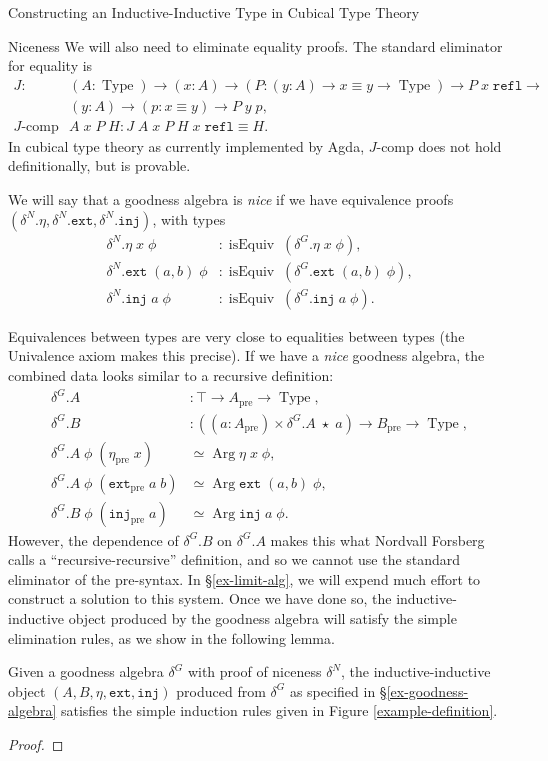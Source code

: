 \documentclass[runningheads]{llncs}
\DeclareMathOperator{\USet}{Type}
\DeclareMathOperator{\isEquiv}{isEquiv}
\DeclareMathOperator{\Arg}{Arg}
\newcommand{\pre}[1]{{#1}_\text{pre}}
\newcommand{\Id}[2]{{#1}\equiv{#2}}
\newcommand{\join}{\texttt{ext}}
\newcommand{\inj}{\texttt{inj}}
\newcommand{\refl}{\texttt{refl}}
\def\Forsberg/{Nordvall Forsberg}
\begin{document}
\begin{section}{Constructing an Inductive-Inductive Type in Cubical Type Theory}
\begin{subsection}{Niceness}
{We will also need to eliminate equality proofs. The standard eliminator for equality is \begin{align*}J :&\; (A : \USet) \to (x : A) \to (P : (y : A) \to \Id{x}{y} \to \USet) \to P\;x\;\refl \to\\&\; (y : A) \to (p : \Id{x}{y}) \to P\;y\;p,\\J\text{-comp}&\;A\;x\;P\;H : \Id{J\;A\;x\;P\;H\;x\;\refl}{H}.\end{align*} In cubical type theory as currently implemented by Agda, $J\text{-comp}$ does not hold definitionally, but is provable.
}

We will say that a goodness algebra is \emph{nice} if we have equivalence proofs $(\delta^N.\eta, \delta^N.\join, \delta^N.\inj)$, with types \begin{align*}
\delta^N.\eta\;x\;\phi &: \isEquiv\; (\delta^G.\eta\;x\;\phi),\\
\delta^N.\join\;(a, b)\;\phi &: \isEquiv\; (\delta^G.\join\;(a, b)\;\phi),\\
\delta^N.\inj\;a\;\phi &: \isEquiv\; (\delta^G.\inj\;a\;\phi).
\end{align*}

Equivalences between types are very close to equalities between types (the Univalence axiom makes this precise). If we have a \emph{nice} goodness algebra, the combined data looks similar to a recursive definition:
\begin{align*}
\delta^G.A &: \top \to \pre{A} \to \USet,\\
\delta^G.B &: ((a : \pre{A}) \times \delta^G.A\;\star\;a) \to \pre{B} \to \USet,\\
\delta^G.A\;\phi\;(\pre{\eta}\;x) &\simeq \Arg\eta\;x\;\phi,\\
\delta^G.A\;\phi\;(\pre{\join}\;a\;b) &\simeq \Arg\join\;(a, b)\;\phi,\\
\delta^G.B\;\phi\;(\pre{\inj}\;a) &\simeq \Arg\inj\;a\;\phi.
\end{align*}
However, the dependence of $\delta^G.B$ on $\delta^G.A$ makes this what \Forsberg/ calls a ``recursive-recursive'' definition, and so we cannot use the standard eliminator of the pre-syntax. In \S\ref{ex-limit-alg}, we will expend much effort to construct a solution to this system. Once we have done so, the inductive-inductive object produced by the goodness algebra will satisfy the simple elimination rules, as we show in the following lemma.

\begin{lemma}
    Given a goodness algebra $\delta^G$ with proof of niceness $\delta^N$, the inductive-inductive object $(A, B, \eta, \join, \inj)$ produced from $\delta^G$ as specified in \S\ref{ex-goodness-algebra} satisfies the simple induction rules given in Figure \ref{example-definition}.
\end{lemma}
\begin{proof}


\end{proof}
\end{subsection}
\end{section}
\end{document}
